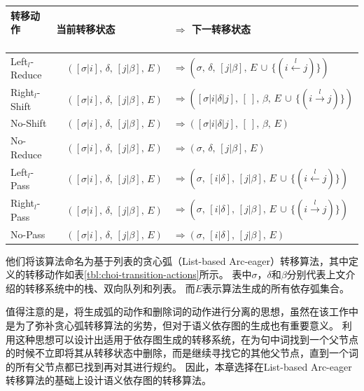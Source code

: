 \begin{table}[htbp]
	\centering
	\renewcommand{\arraystretch}{1.2}
	\begin{tabular}{l|ll}
		\hline
		\bf 转移动作 \ \ \ \ & \bf 当前转移状态 & $\Rightarrow$ \bf 下一转移状态 \\
		\hline\hline
		Left$_l$-Reduce &\ \ $([\sigma|i],\,\delta,\,[j|\beta],\,E)$ & $\Rightarrow (\sigma,\,\delta,\,[j|\beta],\,E\,\cup\,\{(i\xleftarrow{l}j)\})$ \\
		Right$_l$-Shift &\ \ $([\sigma|i],\,\delta,\,[j|\beta],\,E)$ & $\Rightarrow ([\sigma|i|\delta|j],\,[\ ],\,\beta,\,E\,\cup\,\{(i\xrightarrow{l}j)\})$ \\
		No-Shift &\ \ $([\sigma|i],\,\delta,\,[j|\beta],\,E)$ & $\Rightarrow 
		([\sigma|i|\delta|j],\,[\ ],\,\beta,\,E)$ \\
		No-Reduce &\ \ $([\sigma|i],\,\delta,\,[j|\beta],\,E)$ & $\Rightarrow (\sigma,\,\delta,\,[j|\beta],\,E)$\\
		\hline
		Left$_l$-Pass &\ \ $([\sigma|i],\,\delta,\,[j|\beta],\,E)$ & $\Rightarrow (\sigma,\,[i|\delta],\,[j|\beta],\,E\,\cup\,\{(i\xleftarrow{l}j)\})$\\
		Right$_l$-Pass &\ \ $([\sigma|i],\,\delta,\,[j|\beta],\,E)$ & $\Rightarrow (\sigma,\,[i|\delta],\,[j|\beta],\,E\,\cup\,\{(i\xrightarrow{l}j)\})$\\
		No-Pass &\ \ $([\sigma|i],\,\delta,\,[j|\beta],\,E)$ & $\Rightarrow (\sigma,\,[i|\delta]	,\,[j|\beta],\,E)$\\
		\hline
	\end{tabular}
	\label{tbl:actions}
\end{table}

他们将该算法命名为基于列表的贪心弧（List-based Arc-eager）转移算法，其中定义的转移动作如表\ref{tbl:choi-transition-actions}所示。
表中$\sigma$，$\delta$和$\beta$分别代表上文介绍的转移系统中的栈、双向队列和列表。
而$E$表示算法生成的所有依存弧集合。

值得注意的是，将生成弧的动作和删除词的动作进行分离的思想，虽然在该工作中是为了弥补贪心弧转移算法的劣势，但对于语义依存图的生成也有重要意义。
利用这种思想可以设计出适用于依存图生成的转移系统，在为句中词找到一个父节点的时候不立即将其从转移状态中删除，而是继续寻找它的其他父节点，直到一个词的所有父节点都已找到再对其进行规约。
因此，本章选择在List-based Arc-eager转移算法的基础上设计语义依存图的转移算法。


